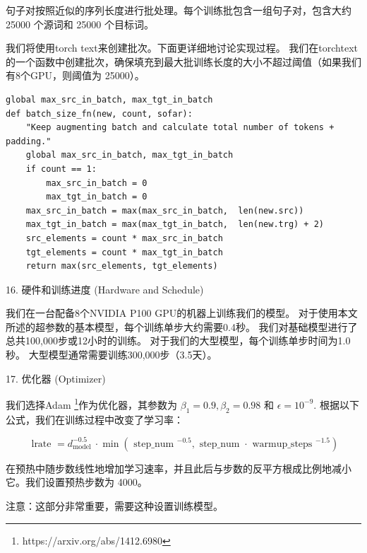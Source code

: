 句子对按照近似的序列长度进行批处理。每个训练批包含一组句子对，包含大约 25000 个源词和 25000 个目标词。

我们将使用torch text来创建批次。下面更详细地讨论实现过程。 我们在torchtext的一个函数中创建批次，确保填充到最大批训练长度的大小不超过阈值（如果我们有8个GPU，则阈值为 25000）。

\begin{Verbatim}
global max_src_in_batch, max_tgt_in_batch
def batch_size_fn(new, count, sofar):
    "Keep augmenting batch and calculate total number of tokens + padding."
    global max_src_in_batch, max_tgt_in_batch
    if count == 1:
        max_src_in_batch = 0
        max_tgt_in_batch = 0
    max_src_in_batch = max(max_src_in_batch,  len(new.src))
    max_tgt_in_batch = max(max_tgt_in_batch,  len(new.trg) + 2)
    src_elements = count * max_src_in_batch
    tgt_elements = count * max_tgt_in_batch
    return max(src_elements, tgt_elements)
\end{Verbatim}

16. 硬件和训练进度 (Hardware and Schedule)

我们在一台配备8个NVIDIA P100 GPU的机器上训练我们的模型。 对于使用本文所述的超参数的基本模型，每个训练单步大约需要0.4秒。 我们对基础模型进行了总共100,000步或12小时的训练。 对于我们的大型模型，每个训练单步时间为1.0秒。 大型模型通常需要训练300,000步（3.5天）。

17. 优化器 (Optimizer)

我们选择Adam \footnote{https://arxiv.org/abs/1412.6980}作为优化器，其参数为 $\beta_{1}=0.9, \beta_{2}=0.98$ 和 $\epsilon=10^{-9}$. 根据以下公式，我们在训练过程中改变了学习率：

\begin{equation}
\text { lrate }=d_{\text {model }}^{-0.5} \cdot \min \left(\text { step\_num }^{-0.5}, \text { step\_num } \cdot \text { warmup\_steps }^{-1.5}\right)
\end{equation}

在预热中随步数线性地增加学习速率，并且此后与步数的反平方根成比例地减小它。我们设置预热步数为 4000。

注意：这部分非常重要，需要这种设置训练模型。

